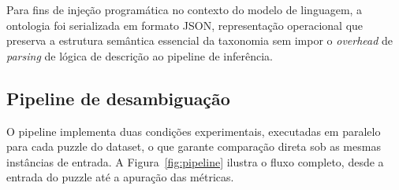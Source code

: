 \documentclass[12pt,a4paper]{article}
\begin{document}
Para fins de injeção programática no contexto do modelo de linguagem, a ontologia foi serializada em formato JSON, representação operacional que preserva a estrutura semântica essencial da taxonomia sem impor o \textit{overhead} de \textit{parsing} de lógica de descrição ao pipeline de inferência.

\subsection{Pipeline de desambiguação}

O pipeline implementa duas condições experimentais, executadas em paralelo para cada puzzle do dataset, o que garante comparação direta sob as mesmas instâncias de entrada. A Figura~\ref{fig:pipeline} ilustra o fluxo completo, desde a entrada do puzzle até a apuração das métricas.
\end{document}
